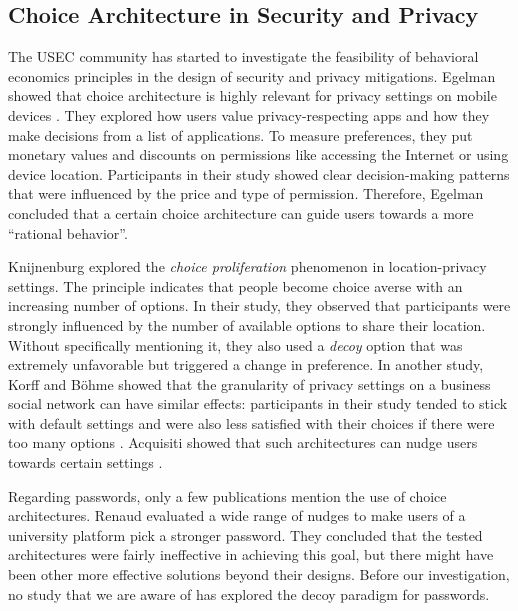 \subsection{Choice Architecture in Security and Privacy}
The \gls{USEC} community has started to investigate the feasibility of behavioral economics principles in the design of security and privacy mitigations. Egelman \etal showed that choice architecture is highly relevant for privacy settings on mobile devices \cite{Egelman2013ChoiceArchitecture}. They explored how users value privacy-respecting apps and how they make decisions from a list of applications. To measure preferences, they put monetary values and discounts on permissions like accessing the Internet or using device location. Participants in their study showed clear decision-making patterns that were influenced by the price and type of permission. Therefore, Egelman \etal concluded that a certain choice architecture can guide users towards a more ``rational behavior''. 

Knijnenburg \etal \cite{Knijnenburg2013MorePrivacyOptions} explored the \textit{choice proliferation} phenomenon in location-privacy settings. The principle indicates that people become choice averse with an increasing number of options. In their study, they observed that participants were strongly influenced by the number of available options to share their location. Without specifically mentioning it, they also used a \textit{decoy} option that was extremely unfavorable but triggered a change in preference. In another study, Korff and Böhme showed that the granularity of privacy settings on a business social network can have similar effects: participants in their study tended to stick with default settings and were also less satisfied with their choices if there were too many options \cite{Korff2014TooMuchChoice}. Acquisiti \etal showed that such architectures can nudge users towards certain settings \cite{Acquisti2017NudgesPrivacySecurity}. 

Regarding passwords, only a few publications mention the use of choice architectures. Renaud \etal evaluated a wide range of nudges to make users of a university platform pick a stronger password. They concluded that the tested architectures were fairly ineffective in achieving this goal, but there might have been other more effective solutions beyond their designs. Before our investigation, no study that we are aware of has explored the decoy paradigm for passwords. 


